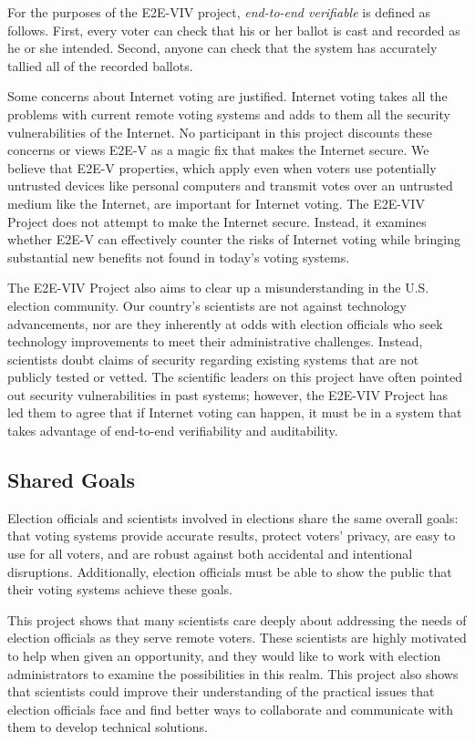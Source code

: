 For the purposes of the E2E-VIV project, \emph{end-to-end
  verifiable} is defined as follows. First, every voter can check
that his or her ballot is cast and recorded as he or she
intended. Second, anyone can check that the system has accurately
tallied all of the recorded ballots.

Some concerns about Internet voting are justified. Internet voting
takes all the problems with current remote voting systems and adds to
them all the security vulnerabilities of the Internet. No participant
in this project discounts these concerns or views E2E-V as a magic fix
that makes the Internet secure. We believe that E2E-V properties,
which apply even when voters use potentially untrusted devices like
personal computers and transmit votes over an untrusted medium like
the Internet, are important for Internet voting. The E2E-VIV Project
does not attempt to make the Internet secure. Instead, it examines
whether E2E-V can effectively counter the risks of Internet voting
while bringing substantial new benefits not found in today’s voting
systems.

The E2E-VIV Project also aims to clear up a misunderstanding in the
U.S. election community. Our country’s scientists are not against
technology advancements, nor are they inherently at odds with election
officials who seek technology improvements to meet their
administrative challenges. Instead, scientists doubt claims of
security regarding existing systems that are not publicly tested or
vetted. The scientific leaders on this project have often pointed out
security vulnerabilities in past systems; however, the E2E-VIV Project
has led them to agree that if Internet voting can happen, it must be
in a system that takes advantage of end-to-end verifiability and
auditability.

\subsection*{Shared Goals}
\label{sec:shared-goals}

Election officials and scientists involved in elections share the same
overall goals: that voting systems provide accurate results, protect
voters’ privacy, are easy to use for all voters, and are robust
against both accidental and intentional disruptions. Additionally,
election officials must be able to show the public that their voting
systems achieve these goals.

This project shows that many scientists care deeply about addressing
the needs of election officials as they serve remote voters. These
scientists are highly motivated to help when given an opportunity, and
they would like to work with election administrators to examine the
possibilities in this realm. This project also shows that scientists
could improve their understanding of the practical issues that
election officials face and find better ways to collaborate and
communicate with them to develop technical solutions.

